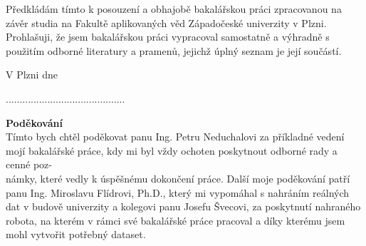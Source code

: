 \documentclass[12pt]{report}
\begin{document}
\noindent Předkládám tímto k posouzení a obhajobě bakalářskou práci zpracovanou na závěr studia na Fakultě aplikovaných věd Západočeské univerzity v Plzni.
\newline
\newline 
\thispagestyle{empty}
Prohlašuji, že jsem bakalářskou práci vypracoval samostatně a výhradně s použitím odborné literatury a pramenů, jejichž úplný seznam je její součástí.\newline
\newline\newline\newline
\begin{minipage}{0.4\textwidth}
	V Plzni dne
\end{minipage} \hfill
\begin{minipage}{0.30\textwidth}
	\hspace{3cm}
	...........................................
\end{minipage}
\newline\newline\newline\newline\newline\newline\newline\newline\newline\newline\newline\newline\newline\newline\newline\newline\newline\newline\newline\newline\newline\newline\newline\newline\newline
\noindent\textbf{\Large{Poděkování}}\\

\noindent Tímto bych chtěl poděkovat panu Ing. Petru Neduchalovi za příkladné vedení mojí bakalářské práce, kdy mi byl vždy ochoten poskytnout odborné rady a cenné poz-\\námky, které vedly k úspěšnému dokončení práce. Další moje poděkování patří panu Ing. Miroslavu Flídrovi, Ph.D., který mi vypomáhal s nahráním reálných dat v budově univerzity a kolegovi panu Josefu Švecovi, za poskytnutí nahraného robota, na kterém v rámci své bakalářské práce pracoval a díky kterému jsem mohl vytvořit potřebný dataset.
\end{document}
